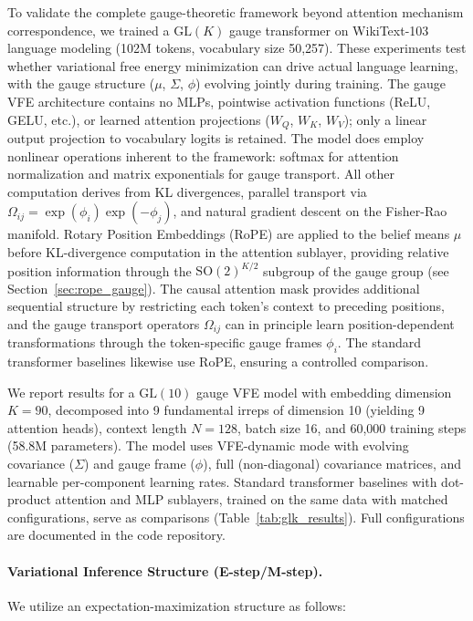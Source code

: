 \documentclass[twoside,11pt]{article}
\begin{document}
To validate the complete gauge-theoretic framework beyond attention mechanism correspondence, we trained a $\mathrm{GL}(K)$ gauge transformer on WikiText-103 language modeling (102M tokens, vocabulary size 50,257). These experiments test whether variational free energy minimization can drive actual language learning, with the gauge structure ($\mu$, $\Sigma$, $\phi$) evolving jointly during training. The gauge VFE architecture contains no MLPs, pointwise activation functions (ReLU, GELU, etc.), or learned attention projections ($W_Q$, $W_K$, $W_V$); only a linear output projection to vocabulary logits is retained. The model does employ nonlinear operations inherent to the framework: softmax for attention normalization and matrix exponentials for gauge transport. All other computation derives from KL divergences, parallel transport via $\Omega_{ij} = \exp(\phi_i) \exp(-\phi_j)$, and natural gradient descent on the Fisher-Rao manifold. Rotary Position Embeddings (RoPE) \citep{su2024roformer} are applied to the belief means $\mu$ before KL-divergence computation in the attention sublayer, providing relative position information through the $\mathrm{SO}(2)^{K/2}$ subgroup of the gauge group (see Section~\ref{sec:rope_gauge}). The causal attention mask provides additional sequential structure by restricting each token's context to preceding positions, and the gauge transport operators $\Omega_{ij}$ can in principle learn position-dependent transformations through the token-specific gauge frames $\phi_i$. The standard transformer baselines likewise use RoPE, ensuring a controlled comparison.

We report results for a $\mathrm{GL}(10)$ gauge VFE model with embedding dimension $K = 90$, decomposed into 9 fundamental irreps of dimension 10 (yielding 9 attention heads), context length $N = 128$, batch size 16, and 60{,}000 training steps (58.8M parameters). The model uses VFE-dynamic mode with evolving covariance ($\Sigma$) and gauge frame ($\phi$), full (non-diagonal) covariance matrices, and learnable per-component learning rates. Standard transformer baselines with dot-product attention and MLP sublayers, trained on the same data with matched configurations, serve as comparisons (Table~\ref{tab:glk_results}). Full configurations are documented in the code repository.


\paragraph{Variational Inference Structure (E-step/M-step).}
We utilize an expectation-maximization structure as follows:
\end{document}
